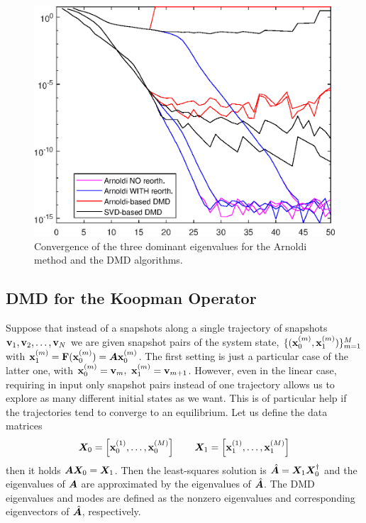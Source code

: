 \begin{figure}[h]
    \centering
    \includegraphics[width=0.5\linewidth]{../code/figures/Arnoldi_vs_DMD.eps}
    \caption{Convergence of the three dominant eigenvalues for the Arnoldi method and the DMD algorithms.}
    \label{arnoldi_vs_DMD}
\end{figure}

\subsection{DMD for the Koopman Operator}
Suppose that instead of a snapshots along a single trajectory of snapshots $\vb{v}_1, \vb{v}_2, \dots, \vb{v}_N$ we are given snapshot pairs of the system state, $\{(\vb{x}_0^{(m)}, \vb{x}_1^{(m)})\}_{m = 1}^M$ with $\vb{x}_1^{(m)} = \vb{F}(\vb{x}_0^{(m)}) = \vb*{A}\vb{x}_0^{(m)}$. The first setting is just a particular case of the latter one, with $\vb{x}_0^{(m)} = \vb{v}_m,\,\,\vb{x}_1^{(m)} = \vb{v}_{m+1}$. However, even in the linear case, requiring in input only snapshot pairs instead of one trajectory allows us to explore as many different initial states as we want. This is of particular help if the trajectories tend to converge to an equilibrium. Let us define the data matrices
\begin{equation}
    \label{dmd_matrices}
    \vb*{X}_0 = \left[\vb{x}_0^{(1)}, \dots, \vb{x}_0^{(M)}\right] \qquad \vb*{X}_1 = \left[\vb{x}_1^{(1)}, \dots, \vb{x}_1^{(M)}\right]
\end{equation}
then it holds $\vb*{A}\vb*{X}_0 = \vb*{X}_1$. Then the least-squares solution is $\hat{\vb*{A}} = \vb*{X}_1\vb*{X}_0^{\dagger}$ and the eigenvalues of $\vb*{A}$ are approximated by the eigenvalues of $\hat{\vb*{A}}$. The DMD eigenvalues and modes are defined as the nonzero eigenvalues and corresponding eigenvectors of $\hat{\vb*{A}}$, respectively.

